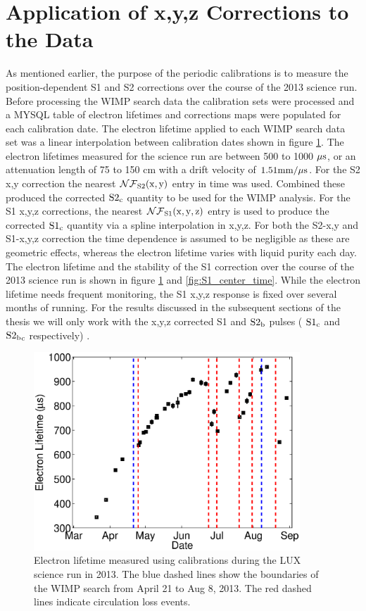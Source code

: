 \newpage

\section{Application of x,y,z Corrections to the Data}

As mentioned earlier, the purpose of the periodic \KrCal calibrations is to measure the position-dependent S1 and S2 corrections over the course of the 2013 science run. Before processing the WIMP search data the calibration sets were processed and a MYSQL table of electron lifetimes and corrections maps were populated for each calibration date. The electron lifetime applied to each WIMP search data set was a linear interpolation between calibration dates shown in figure \ref{fig:S2_EL_time}. The electron lifetimes measured for the science run are between 500 to 1000 $\rm \mu s$, or an attenuation length of 75 to 150 cm with a drift velocity of $\rm 1.51 mm/\mu s$. For the S2 x,y correction the nearest $\rm \mathcal{NF}_{S2}(x,y)$ entry in time was used. Combined these produced the corrected $\rm S2_c$ quantity to be used for the WIMP analysis. For the S1 x,y,z corrections, the nearest $\rm \mathcal{NF}_{S1}(x,y,z)$ entry is used to produce the corrected $\rm S1_c$ quantity via a spline interpolation in x,y,z. For both the S2-x,y and S1-x,y,z correction the time dependence is assumed to be negligible as these are geometric effects, whereas the electron lifetime varies with liquid purity each day.
The electron lifetime and the stability of the S1 correction over the course of the 2013 science run is shown in figure \ref{fig:S2_EL_time} and \ref{fig:S1_center_time}. While the electron lifetime needs frequent monitoring, the S1 x,y,z response is fixed over several months of running.
For the results discussed in the subsequent sections of the thesis we will only work with the x,y,z corrected S1 and $\rm S2_b$ pulses ( $\rm S1_c$ and $\rm S2{_b}_c$ respectively) .

\begin{figure}[h!]\centering
\includegraphics[width=100mm]{Chapter_XYZ_Corr/Thesis_Corr_Plots/lifetime_fig_3.eps}
\caption{Electron lifetime measured using \KrCal calibrations during the LUX science run in 2013. The blue dashed lines show the boundaries of the WIMP search from April 21 to Aug 8, 2013. The red dashed lines indicate circulation loss events.}
\label{fig:S2_EL_time}
\end{figure}

